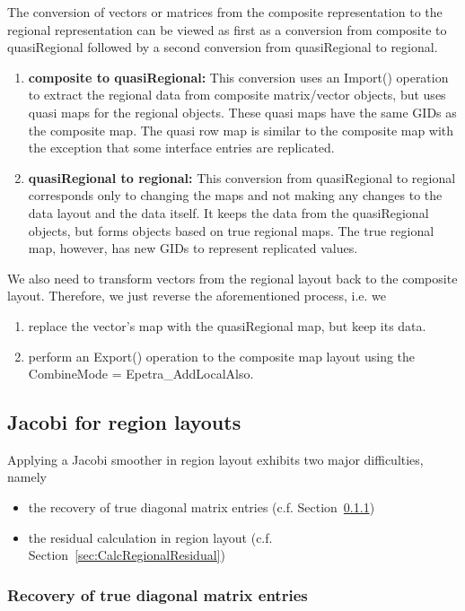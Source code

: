 \documentclass[11pt]{article}
\begin{document}
The conversion of vectors or matrices from the
composite representation to the regional representation can be viewed as
first as a conversion from composite to quasiRegional  followed by
a second conversion from quasiRegional to regional.
\begin{enumerate}
 \item {\bf composite to quasiRegional:} This conversion uses an {\sf Import()} operation
 to extract the regional data from composite matrix/vector objects, but uses quasi maps
 for the regional objects. These quasi maps have the same GIDs
 as the composite map. The quasi row map is similar to the composite
 map with the exception that some interface entries are replicated.
 \item {\bf quasiRegional to regional:} This conversion from quasiRegional to regional corresponds
 only to changing the maps and not making any changes to the data layout and the data itself.
 It keeps the data from the quasiRegional objects,
 but forms objects based on true regional maps.
 The true regional map, however, has new GIDs to represent replicated values.
\end{enumerate}
We also need to transform vectors from the regional layout back to the composite layout. Therefore, we just reverse the aforementioned process, i.e. we
\begin{enumerate}
 \item replace the vector's map with the quasiRegional map, but keep its data.
 \item perform an {\sf Export()} operation to the composite map layout using the {\sf CombineMode = Epetra\_AddLocalAlso}.
\end{enumerate}

\subsection{Jacobi for region layouts}
\label{sec:RegionJacobi}

Applying a Jacobi smoother in region layout exhibits two major difficulties, namely
\begin{itemize}
\item the recovery of true diagonal matrix entries (c.f. Section~\ref{sec:RecoveryTrueDiagonal})
\item the residual calculation in region layout (c.f. Section~\ref{sec:CalcRegionalResidual})
\end{itemize}

\subsubsection{Recovery of true diagonal matrix entries}
\label{sec:RecoveryTrueDiagonal}
\end{document}
